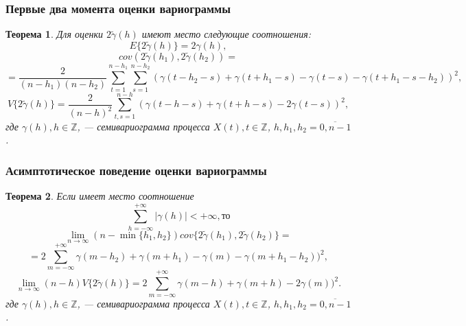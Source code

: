 \documentclass[10pt, ucs, pdf,aspectratio=169]{beamer}
\newtheorem{ru_the}{Теорема}
\renewenvironment{Theorem}{\begin{ru_the}}{\end{ru_the}}
\begin{document}
\begin{frame}
  \frametitle{Первые два момента оценки вариограммы}   %
\begin{Theorem}
  Для оценки $ 2 \tilde{\gamma}(h) $ имеют место следующие соотношения:
  \begin{equation*}
    E \{2 \tilde{\gamma}(h) \} = 2 \gamma(h), %
  \end{equation*}
  \begin{equation*}
    cov(2 \tilde{\gamma}(h_1), 2 \tilde{\gamma}(h_2)) =
  \end{equation*}
  \begin{equation*}
    = \frac{2}{(n - h_1)(n - h_2)} \sum_{t = 1}^{n - h_1}\sum_{s = 1}^{n - h_2} (\gamma(t - h_2 - s) + \gamma(t + h_1 - s) - \gamma(t - s) - \gamma(t + h_1 - s - h_2))^2,
  \end{equation*}
  \begin{equation*}
    V \{ 2 \tilde{\gamma}(h) \} = \frac{2}{(n-h)^2}\sum_{t,s = 1}^{n - h} ( \gamma(t - h - s) + \gamma(t + h - s) - 2\gamma(t - s) )^2,
  \end{equation*}
  где $ \gamma(h), h \in \mathbb{Z} $, --- семивариограмма процесса $ X(t), t \in \mathbb{Z}$, $ h, h_1, h_2 = \overline{0, n - 1} $.
\end{Theorem}
\end{frame}

\begin{frame}
  \frametitle{Асимптотическое поведение оценки вариограммы}   %
  \begin{Theorem}
  Если имеет место соотношение
  \begin{equation*}
    \sum_{h = -\infty}^{+\infty} \vert \gamma(h) \vert < +\infty, \text{то}
  \end{equation*}
  \begin{equation*}
    \lim_{n \to \infty} (n - \min\{ h_1, h_2 \}) cov\{ 2 \tilde{\gamma}(h_1), 2 \tilde{\gamma}(h_2) \} = %
  \end{equation*}
  \begin{equation*}
    = 2 \sum_{m = -\infty}^{+\infty} \gamma(m - h_2) + \gamma(m + h_1) - \gamma(m) - \gamma(m + h_1 - h_2))^2,
  \end{equation*}
  \begin{equation*}
    \lim_{n \to \infty} (n - h) V\{ 2 \tilde{\gamma}(h) \} = 2 \sum_{m = -\infty}^{+\infty} \gamma(m - h) + \gamma(m + h) - 2 \gamma(m))^2.
  \end{equation*}
  где $ \gamma(h), h \in \mathbb{Z} $, --- семивариограмма процесса $ X(t), t \in \mathbb{Z}$, $ h, h_1, h_2 = \overline{0, n - 1} $.
\end{Theorem}
\end{frame}
\end{document}
